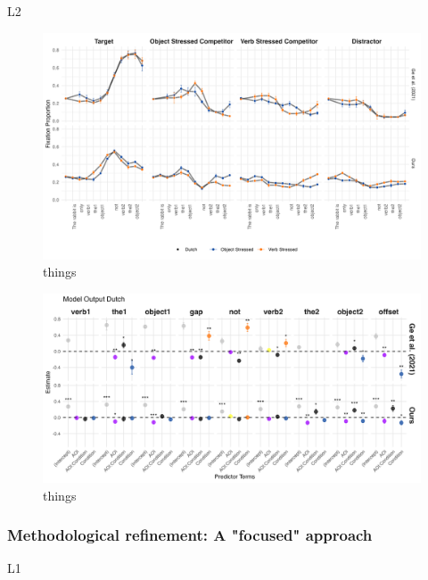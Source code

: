 L2

\begin{figure}[H]  %
    \centering
    \includegraphics[width=\textwidth,height=\textheight,keepaspectratio]{viz/dutch_fix.png}
    \caption{things}
    \label{fig:dutch_fix}
\end{figure}


\begin{figure}[H]  %
    \centering
    \includegraphics[width=\textwidth,height=\textheight,keepaspectratio]{viz/model_plot_dutch.png}
    \caption{things}
    \label{fig:model_plot_dutch}
\end{figure}


\subsubsection{Methodological refinement: A "focused" approach}



L1 

